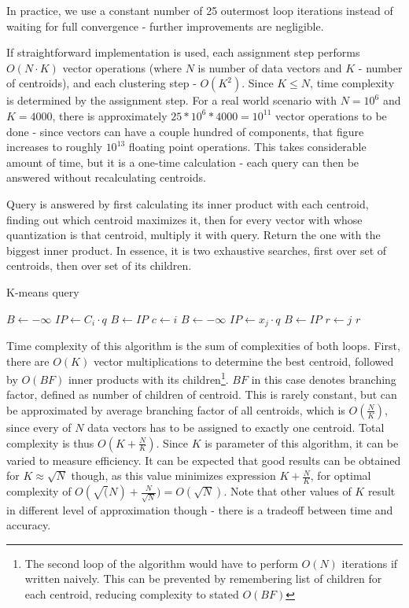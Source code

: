 In practice, we use a constant number of 25 outermost loop iterations
instead of waiting for full convergence - further improvements are negligible.

If straightforward implementation is used, each assignment step performs
$O(N \cdot K)$ vector operations (where $N$ is number of data vectors and
$K$ - number of centroids), and each clustering step - $O(K^2)$. Since
$K \le N$, time complexity is determined by the assignment step. For a real
world scenario with $N = 10^6$ and $K = 4000$, there is approximately
$25 * 10^6 * 4000 = 10^{11}$ vector operations to be done - since vectors
can have a couple hundred of components, that figure increases to roughly
$10^{13}$ floating point operations. This takes considerable amount of time,
but it is a one-time calculation - each query can then be answered without
recalculating centroids.

Query is answered by first calculating its inner product with each centroid,
finding out which centroid maximizes it, then for every vector with whose
quantization is that centroid, multiply it with query. Return the one
with the biggest inner product. In essence, it is two exhaustive searches,
first over set of centroids, then over set of its children.

\begin{algorithm}[H]
	\caption{K-means query}
	\begin{algorithmic}
		\State $B \gets -\infty$
			\State $IP \gets C_i \cdot q$
				\State $B \gets IP$
				\State $c \gets i$
			\EndIf
		\EndFor
		\State $B \gets -\infty$
			\State $IP \gets x_j \cdot q$
				\State $B \gets IP$
				\State $r \gets j$
			\EndIf
		\EndFor
		\State \Return $r$
	\end{algorithmic}
\end{algorithm}

Time complexity of this algorithm is the sum of complexities of both loops.
First, there are $O(K)$ vector multiplications to determine the best centroid,
followed by $O(BF)$ inner products with its children\footnote{The second loop
of the algorithm would have to perform $O(N)$ iterations if written naively.
This can be prevented by remembering list of children for each centroid,
reducing complexity to stated $O(BF)$}.
$BF$ in this case denotes
branching factor, defined as number of children of centroid. This is rarely
constant, but can be approximated by average branching factor of all centroids,
which is $O(\frac{N}{K})$, since every of $N$ data vectors has to be assigned
to exactly one centroid. Total complexity is thus $O(K + \frac{N}{K})$. Since
$K$ is parameter of this algorithm, it can be varied to measure efficiency. It
can be expected that good results can be obtained for $K \approx \sqrt{N}$ 
though, as this value minimizes expression $K + \frac{N}{K}$, for optimal
complexity of $O(\sqrt(N) + \frac{N}{\sqrt{N}}) = O(\sqrt{N})$. Note that other
values of $K$ result in different level of approximation though - there is
a tradeoff between time and accuracy. 

